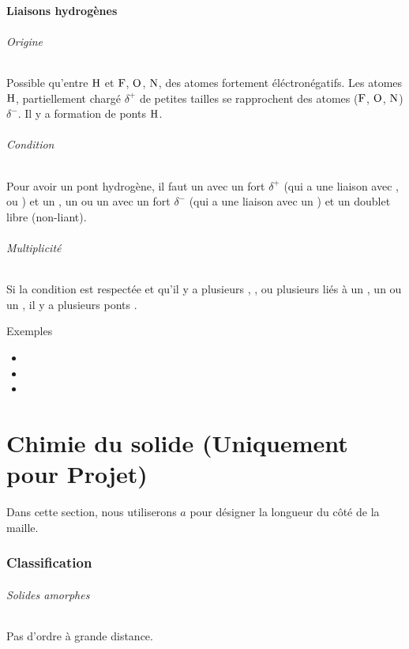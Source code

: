 \documentclass[11pt,a4paper,french]{article}
\begin{document}
\subsection{Liaisons hydrogènes}
\paragraph{Origine}
Possible qu'entre $\ce{H}$ et $\ce{F}$, $\ce{O}$, $\ce{N}$, des atomes fortement éléctronégatifs.
Les atomes $\ce{H}$, partiellement chargé $\delta^+$ de petites tailles se rapprochent des atomes ($\ce{F}$, $\ce{O}$, $\ce{N}$) $\delta^-$.
Il y a formation de ponts $\ce{H}$.
\paragraph{Condition}
Pour avoir un pont hydrogène, il faut un  avec un fort $\delta^+$ (qui a une liaison avec ,  ou ) et un , un  ou un  avec un fort $\delta^-$ (qui a une liaison avec un ) et un doublet libre (non-liant).
\paragraph{Multiplicité}
Si la condition est respectée et qu'il y a plusieurs , ,  ou plusieurs  liés à un , un  ou un , il y a plusieurs ponts .
\subparagraph{Exemples}
\begin{itemize}
	\item {}
	\item {}
	\item {}
\end{itemize}

\part{Chimie du solide (Uniquement pour Projet)}
Dans cette section, nous utiliserons $a$ pour désigner la longueur du côté de la maille.

\section{Classification}

\paragraph{Solides amorphes}
Pas d'ordre à grande distance.
\end{document}
